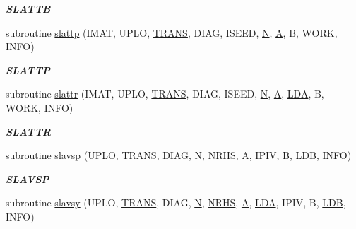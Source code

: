 \begin{DoxyCompactItemize}
\begin{DoxyCompactList}\small\item\em {\bfseries S\+L\+A\+T\+T\+B} \end{DoxyCompactList}\item 
subroutine \hyperlink{group__single__lin_gaab1dc7162a9ad85198777bb05170e3bd}{slattp} (I\+M\+A\+T, U\+P\+L\+O, \hyperlink{superlu__enum__consts_8h_a0c4e17b2d5cea33f9991ccc6a6678d62a1f61e3015bfe0f0c2c3fda4c5a0cdf58}{T\+R\+A\+N\+S}, D\+I\+A\+G, I\+S\+E\+E\+D, \hyperlink{polmisc_8c_a0240ac851181b84ac374872dc5434ee4}{N}, \hyperlink{classA}{A}, B, W\+O\+R\+K, I\+N\+F\+O)
\begin{DoxyCompactList}\small\item\em {\bfseries S\+L\+A\+T\+T\+P} \end{DoxyCompactList}\item 
subroutine \hyperlink{group__single__lin_ga854db7034315fda3d96f7a3f66694a6f}{slattr} (I\+M\+A\+T, U\+P\+L\+O, \hyperlink{superlu__enum__consts_8h_a0c4e17b2d5cea33f9991ccc6a6678d62a1f61e3015bfe0f0c2c3fda4c5a0cdf58}{T\+R\+A\+N\+S}, D\+I\+A\+G, I\+S\+E\+E\+D, \hyperlink{polmisc_8c_a0240ac851181b84ac374872dc5434ee4}{N}, \hyperlink{classA}{A}, \hyperlink{example__user_8c_ae946da542ce0db94dced19b2ecefd1aa}{L\+D\+A}, B, W\+O\+R\+K, I\+N\+F\+O)
\begin{DoxyCompactList}\small\item\em {\bfseries S\+L\+A\+T\+T\+R} \end{DoxyCompactList}\item 
subroutine \hyperlink{group__single__lin_ga039100bbcc887e5fdc436fbdae8ff966}{slavsp} (U\+P\+L\+O, \hyperlink{superlu__enum__consts_8h_a0c4e17b2d5cea33f9991ccc6a6678d62a1f61e3015bfe0f0c2c3fda4c5a0cdf58}{T\+R\+A\+N\+S}, D\+I\+A\+G, \hyperlink{polmisc_8c_a0240ac851181b84ac374872dc5434ee4}{N}, \hyperlink{example__user_8c_aa0138da002ce2a90360df2f521eb3198}{N\+R\+H\+S}, \hyperlink{classA}{A}, I\+P\+I\+V, B, \hyperlink{example__user_8c_a50e90a7104df172b5a89a06c47fcca04}{L\+D\+B}, I\+N\+F\+O)
\begin{DoxyCompactList}\small\item\em {\bfseries S\+L\+A\+V\+S\+P} \end{DoxyCompactList}\item 
subroutine \hyperlink{group__single__lin_gac3daab39f4b8d3b2c5f9b214ac05d87a}{slavsy} (U\+P\+L\+O, \hyperlink{superlu__enum__consts_8h_a0c4e17b2d5cea33f9991ccc6a6678d62a1f61e3015bfe0f0c2c3fda4c5a0cdf58}{T\+R\+A\+N\+S}, D\+I\+A\+G, \hyperlink{polmisc_8c_a0240ac851181b84ac374872dc5434ee4}{N}, \hyperlink{example__user_8c_aa0138da002ce2a90360df2f521eb3198}{N\+R\+H\+S}, \hyperlink{classA}{A}, \hyperlink{example__user_8c_ae946da542ce0db94dced19b2ecefd1aa}{L\+D\+A}, I\+P\+I\+V, B, \hyperlink{example__user_8c_a50e90a7104df172b5a89a06c47fcca04}{L\+D\+B}, I\+N\+F\+O)

\end{DoxyCompactItemize}
